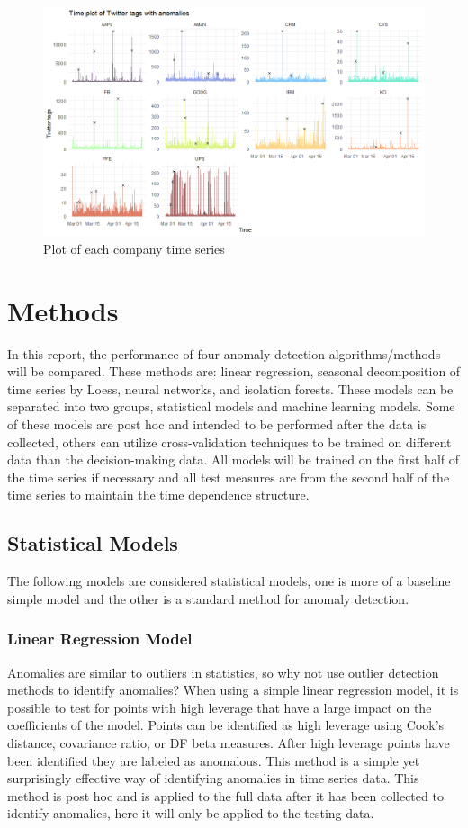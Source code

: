 \documentclass{article}
\begin{document}
\begin{figure}[!ht]
    \centering
    \includegraphics[width=.7\textwidth]{data_plot.png}
    \caption{Plot of each company time series}
    \label{fig:data}
\end{figure}

\newpage 

\section{Methods}
In this report, the performance of four anomaly detection algorithms/methods will be compared. These methods are: linear regression, seasonal decomposition of time series by Loess, neural networks, and isolation forests. These models can be separated into two groups, statistical models and machine learning models. Some of these models are post hoc and intended to be performed after the data is collected, others can utilize cross-validation techniques to be trained on different data than the decision-making data. All models will be trained on the first half of the time series if necessary and all test measures are from the second half of the time series to maintain the time dependence structure.

\subsection{Statistical Models}
The following models are considered statistical models, one is more of a baseline simple model and the other is a standard method for anomaly detection. 

\subsubsection{Linear Regression Model}
Anomalies are similar to outliers in statistics, so why not use outlier detection methods to identify anomalies? When using a simple linear regression model, it is possible to test for points with high leverage that have a large impact on the coefficients of the model. Points can be identified as high leverage using Cook's distance, covariance ratio, or DF beta measures. After high leverage points have been identified they are labeled as anomalous. This method is a simple yet surprisingly effective way of identifying anomalies in time series data. This method is post hoc and is applied to the full data after it has been collected to identify anomalies, here it will only be applied to the testing data. 
\end{document}
